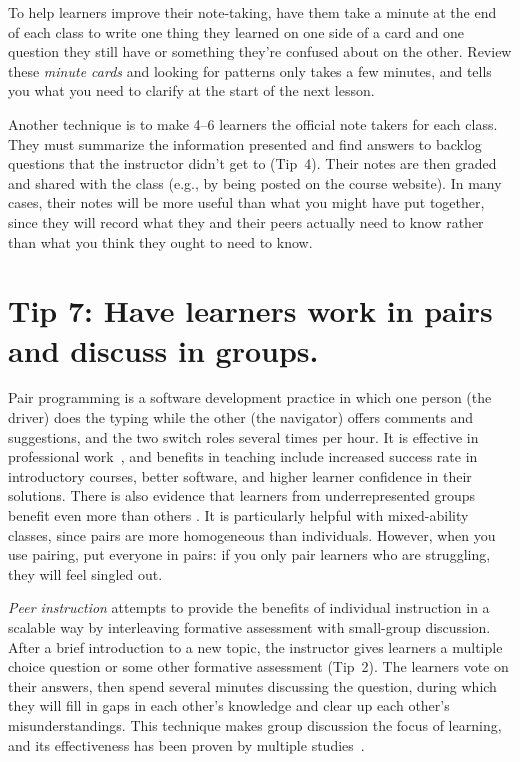 \documentclass[10pt,letterpaper]{article}
\newcommand{\rulemajor}[1]{\section{#1}}
\begin{document}
To help learners improve their note-taking,
have them take a minute at the end of each class
to write one thing they learned on one side of a card
and one question they still have or something they're confused about on the other.
Review these \emph{minute cards} and looking for patterns only takes a few minutes,
and tells you what you need to clarify at the start of the next lesson.

Another technique is to make 4--6 learners the official note takers for each class.
They must summarize the information presented
and find answers to backlog questions that the instructor didn't get to (Tip~4).
Their notes are then graded and shared with the class
(e.g., by being posted on the course website).
In many cases,
their notes will be more useful than what you might have put together,
since they will record what they and their peers actually need to know
rather than what you think they ought to need to know.

\rulemajor{Tip 7: Have learners work in pairs and discuss in groups.}

Pair programming is a software development practice
in which one person (the driver) does the typing
while the other (the navigator) offers comments and suggestions,
and the two switch roles several times per hour.
It is effective in professional work~\cite{Hann2009},
and benefits in teaching include increased success rate in introductory courses,
better software,
and higher learner confidence in their solutions.
There is also evidence that learners from underrepresented groups
benefit even more than others \cite{McDo2006,Hank2011,Cele2018}.
It is particularly helpful with mixed-ability classes,
since pairs are more homogeneous than individuals.
However,
when you use pairing,
put everyone in pairs:
if you only pair learners who are struggling,
they will feel singled out.

\emph{Peer instruction} attempts to provide the benefits of individual instruction in a scalable way
by interleaving formative assessment with small-group discussion.
After a brief introduction to a new topic,
the instructor gives learners a multiple choice question or some other formative assessment
(Tip~2).
The learners vote on their answers,
then spend several minutes discussing the question,
during which they will fill in gaps in each other's knowledge
and clear up each other's misunderstandings.
This technique makes group discussion the focus of learning,
and its effectiveness has been proven by multiple studies~\cite{Crou2001,Smit2009,Port2016}.
\end{document}
